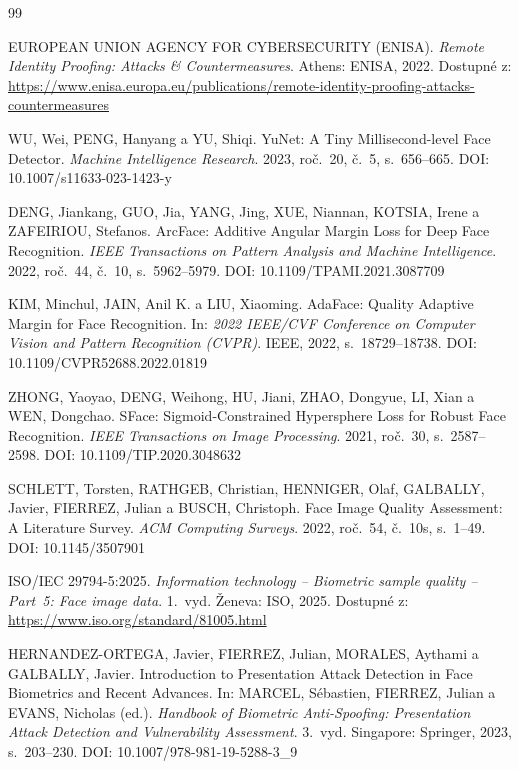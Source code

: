 \documentclass[12pt,a4paper,oneside]{report}
\begin{document}
\begin{thebibliography}{99}

EUROPEAN UNION AGENCY FOR CYBERSECURITY (ENISA).
\textit{Remote Identity Proofing: Attacks \& Countermeasures}.
Athens: ENISA, 2022.
Dostupné z: \url{https://www.enisa.europa.eu/publications/remote-identity-proofing-attacks-countermeasures}

WU, Wei, PENG, Hanyang a YU, Shiqi.
YuNet: A Tiny Millisecond-level Face Detector.
\textit{Machine Intelligence Research}. 2023, roč.~20, č.~5, s.~656--665.
DOI: 10.1007/s11633-023-1423-y

DENG, Jiankang, GUO, Jia, YANG, Jing, XUE, Niannan, KOTSIA, Irene a ZAFEIRIOU, Stefanos.
ArcFace: Additive Angular Margin Loss for Deep Face Recognition.
\textit{IEEE Transactions on Pattern Analysis and Machine Intelligence}. 2022,
roč.~44, č.~10, s.~5962--5979.
DOI: 10.1109/TPAMI.2021.3087709

KIM, Minchul, JAIN, Anil K. a LIU, Xiaoming.
AdaFace: Quality Adaptive Margin for Face Recognition.
In: \textit{2022 IEEE/CVF Conference on Computer Vision and Pattern Recognition (CVPR)}.
IEEE, 2022, s.~18729--18738.
DOI: 10.1109/CVPR52688.2022.01819

ZHONG, Yaoyao, DENG, Weihong, HU, Jiani, ZHAO, Dongyue, LI, Xian a WEN, Dongchao.
SFace: Sigmoid-Constrained Hypersphere Loss for Robust Face Recognition.
\textit{IEEE Transactions on Image Processing}. 2021, roč.~30, s.~2587--2598.
DOI: 10.1109/TIP.2020.3048632

SCHLETT, Torsten, RATHGEB, Christian, HENNIGER, Olaf, GALBALLY, Javier,
FIERREZ, Julian a BUSCH, Christoph.
Face Image Quality Assessment: A Literature Survey.
\textit{ACM Computing Surveys}. 2022, roč.~54, č.~10s, s.~1--49.
DOI: 10.1145/3507901

ISO/IEC 29794-5:2025.
\textit{Information technology -- Biometric sample quality -- Part~5: Face image data}.
1.~vyd. Ženeva: ISO, 2025.
Dostupné z: \url{https://www.iso.org/standard/81005.html}

HERNANDEZ-ORTEGA, Javier, FIERREZ, Julian, MORALES, Aythami a GALBALLY, Javier.
Introduction to Presentation Attack Detection in Face Biometrics and Recent Advances.
In: MARCEL, Sébastien, FIERREZ, Julian a EVANS, Nicholas (ed.).
\textit{Handbook of Biometric Anti-Spoofing: Presentation Attack Detection and
Vulnerability Assessment}. 3.~vyd. Singapore: Springer, 2023, s.~203--230.
DOI: 10.1007/978-981-19-5288-3\_9


\end{thebibliography}
\end{document}
